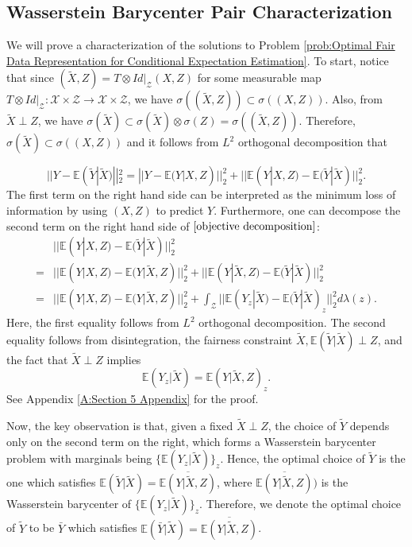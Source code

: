 \documentclass[twoside,11pt]{article}
\begin{document}
\subsection{Wasserstein Barycenter Pair Characterization}

We will prove a characterization of the solutions to Problem \ref{prob:Optimal Fair Data Representation for Conditional Expectation Estimation}. To start, notice that since $(\tilde{X},Z) = T \otimes Id|_{\mathcal{Z}}(X,Z)$ for some measurable map $T \otimes Id|_{\mathcal{Z}}: \mathcal{X} \times \mathcal{Z} \rightarrow \mathcal{X} \times \mathcal{Z}$, we have $\sigma((\tilde{X},Z)) \subset \sigma((X,Z))$. Also, from $\tilde{X} \perp Z$, we have $\sigma(\tilde{X}) \subset \sigma(\tilde{X}) \otimes \sigma(Z) = \sigma((\tilde{X},Z))$. Therefore,  $\sigma(\tilde{X}) \subset \sigma((X,Z))$ and it follows from $L^2$ orthogonal decomposition that

\begin{equation}\label{objective decomposition}
||Y - \mathbb{E}(\tilde{Y}|\tilde{X})||^2_2 = ||Y - \mathbb{E}(Y|X,Z)||^2_2 + ||\mathbb{E}(Y|X,Z) - \mathbb{E}(\tilde{Y}|\tilde{X})||^2_2.
\end{equation} 
The first term on the right hand side can be interpreted as the minimum loss of information by using $(X,Z)$ to predict $Y$. Furthermore, one can decompose the second term on the right hand side of $\eqref{objective decomposition}$:
\begin{align*}
   & ||\mathbb{E}(Y|X,Z) - \mathbb{E}(\tilde{Y}|\tilde{X})||^2_2\\
= & ||\mathbb{E}(Y|X,Z) - \mathbb{E}(Y|\tilde{X},Z)||_2^2 + ||\mathbb{E}(Y|\tilde{X},Z) - \mathbb{E}(\tilde{Y}|\tilde{X})||^2_2\\
= & ||\mathbb{E}(Y|X,Z) - \mathbb{E}(Y|\tilde{X},Z)||_2^2 + \int_{\mathcal{Z}} ||\mathbb{E}(Y_z|\tilde{X}) - \mathbb{E}(\tilde{Y}|\tilde{X})_z||^2_2 d\lambda(z).
\end{align*}
Here, the first equality follows from $L^2$ orthogonal decomposition. The second equality follows from disintegration, the fairness constraint $\tilde{X},\mathbb{E}(\tilde{Y}|\tilde{X}) \perp Z$, and the fact that $\tilde{X} \perp Z$ implies $$\mathbb{E}(Y_z|\tilde{X}) = \mathbb{E}(Y|\tilde{X},Z)_z.$$ See Appendix \ref{A:Section 5 Appendix} for the proof.

Now, the key observation is that, given a fixed $\tilde{X} \perp Z$, the choice of $\tilde{Y}$ depends only on the second term on the right, which forms a Wasserstein barycenter problem with marginals being $\{\mathbb{E}(Y_z|\tilde{X})\}_z$. Hence, the optimal choice of $\tilde{Y}$ is the one which satisfies $\mathbb{E}(\tilde{Y} | \tilde{X}) = \overline{\mathbb{E}(Y| \tilde{X},Z)}$, where $\overline{\mathbb{E}(Y| \tilde{X},Z)})$ is the Wasserstein barycenter of $\{\mathbb{E}(Y_z|\tilde{X})\}_z$. Therefore, we denote the optimal choice of $\tilde{Y}$ to be $\bar{Y}$ which satisfies $\mathbb{E}(\bar{Y}|\tilde{X}) = \overline{\mathbb{E}(Y| \tilde{X},Z)}$.
\end{document}
